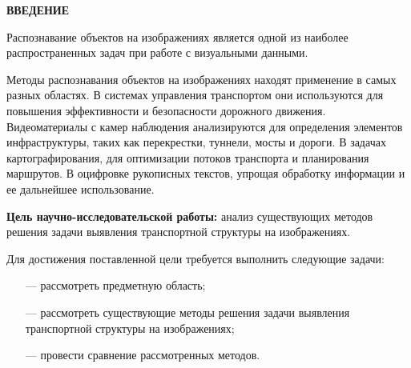 \begin{center}
    \textbf{ВВЕДЕНИЕ}
\end{center}

Распознавание объектов на изображениях является одной из наиболее распространенных задач при работе с визуальными данными.

Методы распознавания объектов на изображениях находят применение в самых разных областях. В системах управления транспортом они используются для повышения эффективности и безопасности дорожного движения. Видеоматериалы с камер наблюдения анализируются для определения элементов инфраструктуры, таких как перекрестки, туннели, мосты и дороги. В задачах картографирования, для оптимизации потоков транспорта и планирования маршрутов. В оцифровке рукописных текстов, упрощая обработку информации и ее дальнейшее использование.

\textbf{Цель научно-исследовательской работы:} анализ существующих методов решения задачи выявления транспортной структуры на изображениях.

Для достижения поставленной цели требуется выполнить следующие задачи:

\begin{itemize}
    \item[---] рассмотреть предметную область;
    \item[---] рассмотреть существующие методы решения задачи выявления транспортной структуры на изображениях;
    \item[---] провести сравнение рассмотренных методов.
\end{itemize}

\clearpage
